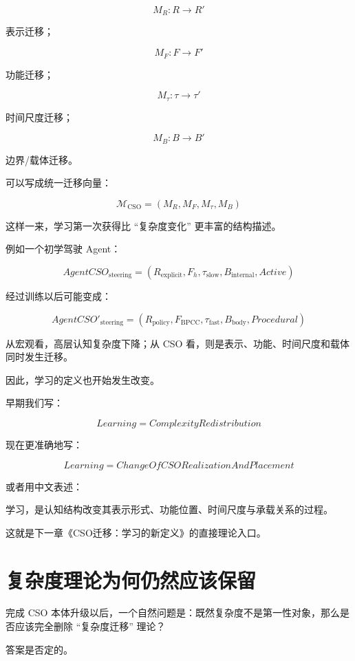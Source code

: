 \[
\boxed{
M_R:
R\rightarrow R'
}
\]

表示迁移；

\[
\boxed{
M_F:
F\rightarrow F'
}
\]

功能迁移；

\[
\boxed{
M_\tau:
\tau\rightarrow\tau'
}
\]

时间尺度迁移；

\[
\boxed{
M_B:
B\rightarrow B'
}
\]

边界/载体迁移。

可以写成统一迁移向量：

\[
\boxed{
\mathcal M_{\mathrm{CSO}}
=
(
M_R,
M_F,
M_\tau,
M_B
)
}
\]

这样一来，学习第一次获得比 ``复杂度变化'' 更丰富的结构描述。

例如一个初学驾驶 Agent：

\[
AgentCSO_{\mathrm{steering}}
=
(
R_{\mathrm{explicit}},
F_h,
\tau_{\mathrm{slow}},
B_{\mathrm{internal}},
Active
)
\]

经过训练以后可能变成：

\[
AgentCSO'_{\mathrm{steering}}
=
(
R_{\mathrm{policy}},
F_{\mathrm{BPCC}},
\tau_{\mathrm{fast}},
B_{\mathrm{body}},
Procedural
)
\]

从宏观看，高层认知复杂度下降；从 CSO 看，则是表示、功能、时间尺度和载体同时发生迁移。

因此，学习的定义也开始发生改变。

早期我们写：

\[
\boxed{
Learning
=
ComplexityRedistribution
}
\]

现在更准确地写：

\[
\boxed{
Learning
=
ChangeOfCSORealizationAndPlacement
}
\]

或者用中文表述：

\begin{statementbox}
学习，是认知结构改变其表示形式、功能位置、时间尺度与承载关系的过程。
\end{statementbox}

这就是下一章《CSO迁移：学习的新定义》的直接理论入口。

\section{复杂度理论为何仍然应该保留}
\label{sec:why-keep-complexity}

完成 CSO 本体升级以后，一个自然问题是：既然复杂度不是第一性对象，那么是否应该完全删除 ``复杂度迁移'' 理论？

答案是否定的。

